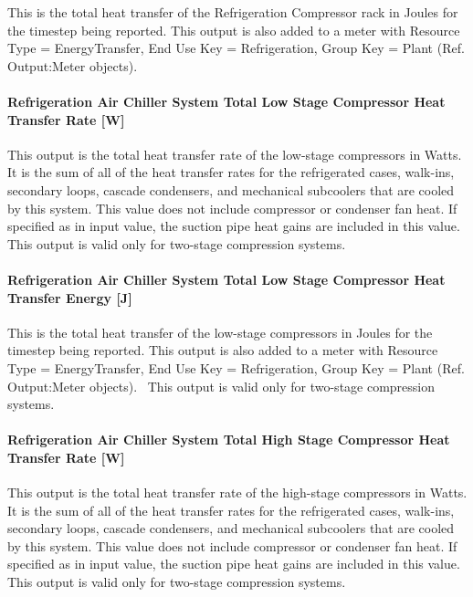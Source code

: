 This is the total heat transfer of the Refrigeration Compressor rack in Joules for the timestep being reported. This output is also added to a meter with Resource Type = EnergyTransfer, End Use Key = Refrigeration, Group Key = Plant (Ref. Output:Meter objects).

\paragraph{Refrigeration Air Chiller System Total Low Stage Compressor Heat Transfer Rate {[}W{]}}\label{refrigeration-air-chiller-system-total-low-stage-compressor-heat-transfer-rate-w}

This output is the total heat transfer rate of the low-stage compressors in Watts. It is the sum of all of the heat transfer rates for the refrigerated cases, walk-ins, secondary loops, cascade condensers, and mechanical subcoolers that are cooled by this system. This value does not include compressor or condenser fan heat. If specified as in input value, the suction pipe heat gains are included in this value.~ This output is valid only for two-stage compression systems.

\paragraph{Refrigeration Air Chiller System Total Low Stage Compressor Heat Transfer Energy {[}J{]}}\label{refrigeration-air-chiller-system-total-low-stage-compressor-heat-transfer-energy-j}

This is the total heat transfer of the low-stage compressors in Joules for the timestep being reported. This output is also added to a meter with Resource Type = EnergyTransfer, End Use Key = Refrigeration, Group Key = Plant (Ref. Output:Meter objects).~ This output is valid only for two-stage compression systems.

\paragraph{Refrigeration Air Chiller System Total High Stage Compressor Heat Transfer Rate {[}W{]}}\label{refrigeration-air-chiller-system-total-high-stage-compressor-heat-transfer-rate-w}

This output is the total heat transfer rate of the high-stage compressors in Watts. It is the sum of all of the heat transfer rates for the refrigerated cases, walk-ins, secondary loops, cascade condensers, and mechanical subcoolers that are cooled by this system. This value does not include compressor or condenser fan heat. If specified as in input value, the suction pipe heat gains are included in this value.~ This output is valid only for two-stage compression systems.

